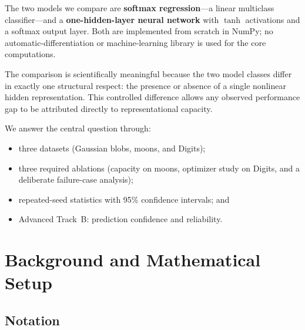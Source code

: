 \documentclass[11pt]{article}
\begin{document}
The two models we compare are \textbf{softmax regression}---a linear multiclass
classifier---and a \textbf{one-hidden-layer neural network} with $\tanh$
activations and a softmax output layer.
Both are implemented from scratch in NumPy; no automatic-differentiation or
machine-learning library is used for the core computations.

The comparison is scientifically meaningful because the two model classes differ
in exactly one structural respect: the presence or absence of a single nonlinear
hidden representation.
This controlled difference allows any observed performance gap to be attributed
directly to representational capacity.

We answer the central question through:
\begin{itemize}[leftmargin=1.5em]
  \item three datasets (Gaussian blobs, moons, and Digits);
  \item three required ablations (capacity on moons, optimizer study on Digits,
        and a deliberate failure-case analysis);
  \item repeated-seed statistics with 95\% confidence intervals; and
  \item Advanced Track~B: prediction confidence and reliability.
\end{itemize}

\section{Background and Mathematical Setup}
\label{sec:background}

\subsection{Notation}
\end{document}
